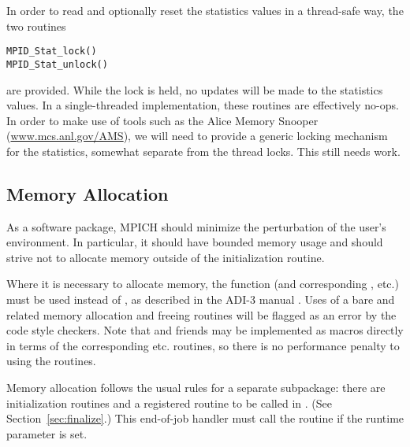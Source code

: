 \documentclass{article}
\begin{document}
In order to read and optionally reset the statistics values in a thread-safe
way, the two routines
\begin{verbatim}
MPID_Stat_lock()
MPID_Stat_unlock()
\end{verbatim}
are provided.  While the lock is held, no updates will be made to the
statistics values.  In a single-threaded implementation, these routines are
effectively no-ops.  
In order to make use of tools such as the Alice Memory Snooper
(\url{www.mcs.anl.gov/AMS}), we will need to provide a generic locking
mechanism for the statistics, somewhat separate from the thread locks.  This
still needs work.

\subsection{Memory Allocation}
As a software package, MPICH should minimize the perturbation of the user's
environment.  In 
particular, it should have bounded memory usage and should strive not to
allocate memory outside of the initialization routine.  

Where it is necessary to allocate memory, the function 
(and corresponding , etc.) must be used instead of
, as described in the ADI-3 manual \cite{adi3man}.  Uses of a
bare  and related memory allocation and freeing routines will be
flagged as an error by the code style checkers.  Note that 
and friends may be implemented as macros directly in terms of the
corresponding  etc. routines, so there is no performance penalty
to using the  routines.

Memory allocation follows the usual rules for a separate subpackage: there are
initialization routines and a registered routine to be called in
. (See Section~\ref{sec:finalize}.)  This end-of-job
handler must call the 
routine  if the runtime parameter
 is set.  


\end{document}
